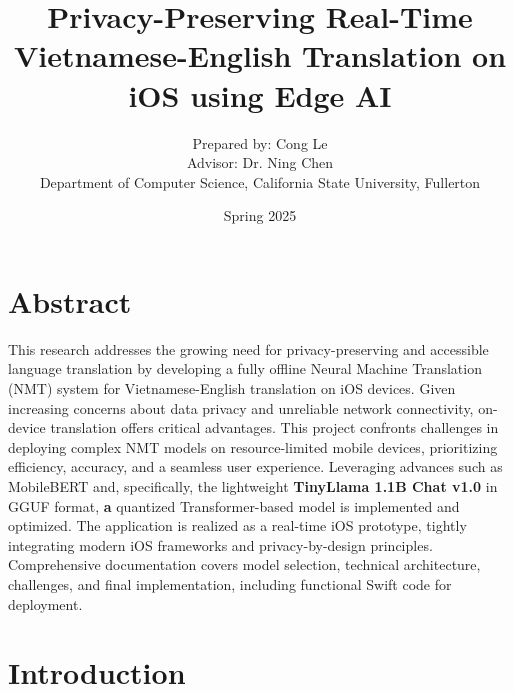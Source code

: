 \documentclass[12pt]{article}
\title{\textbf{Privacy-Preserving Real-Time Vietnamese-English Translation on iOS using Edge AI}}
\author{Prepared by: Cong Le \\
Advisor: Dr. Ning Chen \\
Department of Computer Science, California State University, Fullerton}
\date{Spring 2025}
\begin{document}
\maketitle



\section*{Abstract}
This research addresses the growing need for privacy-preserving and accessible language translation by developing a fully offline Neural Machine Translation (NMT) system for Vietnamese-English translation on iOS devices. Given increasing concerns about data privacy and unreliable network connectivity, on-device translation offers critical advantages. This project confronts challenges in deploying complex NMT models on resource-limited mobile devices, prioritizing efficiency, accuracy, and a seamless user experience. Leveraging advances such as MobileBERT and, specifically, the lightweight \textbf{TinyLlama 1.1B Chat v1.0} in GGUF format, \textbf{a} quantized Transformer-based model is implemented and optimized. The application is realized as a real-time iOS prototype, tightly integrating modern iOS frameworks and privacy-by-design principles. Comprehensive documentation covers model selection, technical architecture, challenges, and final implementation, including functional Swift code for deployment.

\tableofcontents

\newpage

\section{Introduction}
\end{document}
